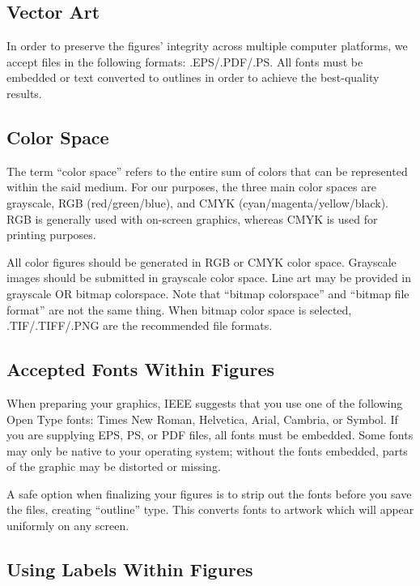 \documentclass[letter]{IEEEtaes}
\begin{document}
\subsection{Vector Art}

In order to preserve the figures' integrity across multiple computer platforms, we accept files in the following formats: .EPS/.PDF/.PS. All fonts must be embedded or text converted to outlines in order to achieve the best-quality results.

\subsection{Color Space}

The term ``color space'' refers to the entire sum of colors that can be represented within the said medium. For our purposes, the three main color spaces are grayscale, RGB (red/green/blue), and CMYK (cyan/magenta/yellow/black). RGB is generally used with on-screen graphics, whereas CMYK is used for printing purposes.

All color figures should be generated in RGB or CMYK color space. Grayscale images should be submitted in grayscale color space. Line art may be provided in grayscale OR bitmap colorspace. Note that ``bitmap colorspace'' and ``bitmap file format'' are not the same thing. When bitmap color space is selected, .TIF/.TIFF/.PNG are the recommended file formats.

\subsection{Accepted Fonts Within Figures}

When preparing your graphics, IEEE suggests that you use one of the
following Open Type fonts: Times New Roman, Helvetica, Arial, Cambria,
or Symbol. If you are supplying EPS, PS, or PDF files, all fonts must be
embedded. Some fonts may only be native to your operating system;
without the fonts embedded, parts of the graphic may be distorted or
missing.

A safe option when finalizing your figures is to strip out the fonts
before you save the files, creating ``outline'' type. This converts
fonts to artwork which will appear uniformly on any screen.

\subsection{Using Labels Within Figures}
\end{document}
